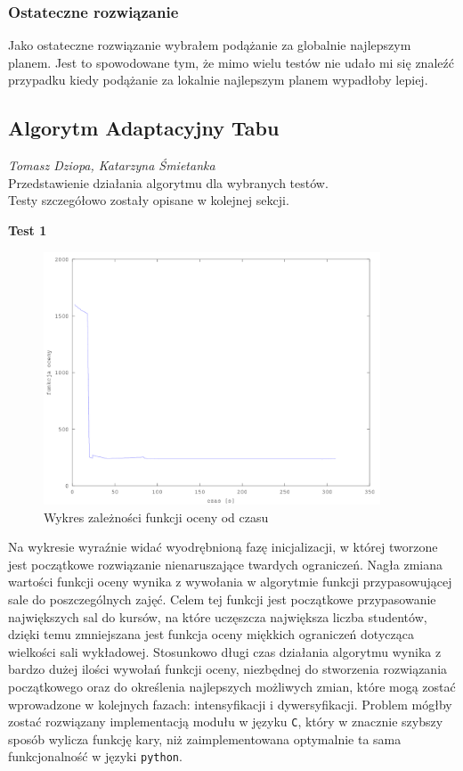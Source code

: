\subsubsection{Ostateczne rozwiązanie}

\par Jako ostateczne rozwiązanie wybrałem podążanie za globalnie najlepszym planem. Jest to spowodowane tym, że mimo wielu testów nie udało mi się znaleźć przypadku kiedy podążanie za lokalnie najlepszym planem wypadłoby lepiej. 
\subsection{Algorytm Adaptacyjny Tabu}
\textit{Tomasz Dziopa, Katarzyna Śmietanka}\\
Przedstawienie działania algorytmu dla wybranych testów.\\
Testy szczegółowo zostały opisane w kolejnej sekcji.
\par \textbf{Test 1}
\begin{figure}[H]
 
  \centering
    \includegraphics[width=10cm]{ogolny.png}
     \caption{Wykres zależności funkcji oceny od czasu}
\end{figure}
Na wykresie wyraźnie widać wyodrębnioną fazę inicjalizacji, w której tworzone jest początkowe rozwiązanie nienaruszające twardych ograniczeń. Nagła zmiana wartości funkcji oceny wynika z wywołania w algorytmie funkcji przypasowującej sale do poszczególnych zajęć. Celem tej funkcji jest początkowe przypasowanie największych sal do kursów, na które uczęszcza największa liczba studentów, dzięki temu zmniejszana jest funkcja oceny miękkich ograniczeń dotycząca wielkości sali wykładowej. Stosunkowo długi czas działania algorytmu wynika z bardzo dużej ilości wywołań funkcji oceny, niezbędnej do stworzenia rozwiązania początkowego oraz do określenia najlepszych możliwych zmian, które mogą zostać wprowadzone w kolejnych fazach: intensyfikacji i dywersyfikacji. Problem mógłby zostać rozwiązany implementacją modułu w języku \verb#C#, który w znacznie szybszy sposób wylicza funkcję kary, niż zaimplementowana optymalnie ta sama funkcjonalność w języki \verb#python#.
